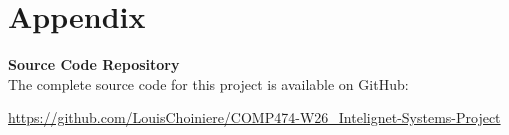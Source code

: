 \documentclass{article}
\begin{document}

\pagebreak
\section{Appendix}

\textbf{Source Code Repository}\\
The complete source code for this project is available on GitHub:

\url{https://github.com/LouisChoiniere/COMP474-W26\_Intelignet-Systems-Project}

\begin{file}

\end{file}

\begin{file}

\end{file}

\begin{file}

\end{file}

\begin{file}

\end{file}

\begin{file}

\end{file}

\end{document}
